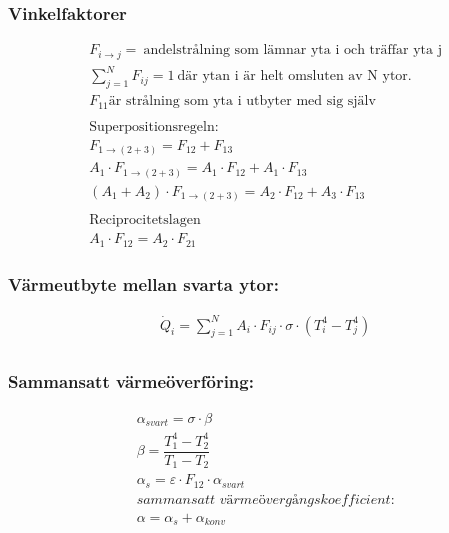 \subsubsection*{Vinkelfaktorer}
\begin{align*}
	& F_{i \rightarrow j} = \ \text{andelstrålning som lämnar yta i och träffar yta j} \\
	& \sum\limits_{j=1}^N F_{ij} = 1 \ \text{där ytan i är helt omsluten av N ytor.} \\ 
	& F_{11} \text{är strålning som yta i utbyter med sig själv}\\
	\\
	& \text{Superpositionsregeln:} \\
	& F_{1 \rightarrow (2+3)} = F_{12} + F_{13} \\
	& A_1  \cdot F_{1 \rightarrow (2+3)} = A_1 \cdot F_{12} + A_1 \cdot F_{13} \\
	& (A_1 + A_2) \cdot F_{1 \rightarrow (2+3)} = A_2 \cdot F_{12} + A_3 \cdot F_{13} \\
	\\
	& \text{Reciprocitetslagen} \\
	& A_1 \cdot F_{12} = A_2 \cdot F_{21}
\end{align*}
\subsubsection*{Värmeutbyte mellan svarta ytor:}
\begin{align*}
	& \dot{Q}_i = \sum\limits_{j=1}^N A_i \cdot F_{ij} \cdot \sigma \cdot \left( T_i^4 - T_j^4 \right) \\
\end{align*}
\subsubsection*{Sammansatt värmeöverföring:}
\begin{align*}
	& \alpha_{svart} = \sigma \cdot \beta \\
	& \beta = \dfrac{T_1^4 - T_2^4}{T_1 - T_2} \\
	& \alpha_s = \varepsilon \cdot F_{12} \cdot \alpha_{svart} \\
	& \textit{sammansatt värmeövergångskoefficient:} \\
	& \alpha = \alpha_s + \alpha_{konv}
\end{align*}

